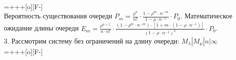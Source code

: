 \documentclass{article}
\begin{document}
\\
\entrymodifiers={+++[o][F-]}
\vspace{\baselineskip}
\\
Вероятность существования очереди \begin{math}P_m  = \displaystyle\frac{\rho^n}{n!} \cdot \displaystyle\frac{1 - \rho^m \cdot n^{-m}}{1 - \rho \cdot n^{-1}} \cdot P_0\end{math}. Математическое ожидание длины очереди \begin{math}E_m  = \displaystyle\frac{\rho^{n+1}}{n \cdot n!} \cdot \displaystyle\frac{(1 - \rho^m \cdot n^{-m}) \cdot [1 + m \cdot (1 -\rho \cdot n^{-1}) ] }{(1 - \rho \cdot n^{-1})^2} \cdot P_0\end{math}.
\vspace{\baselineskip}
\\
3. Рассмотрим систему без ограничений на длину очереди:
\begin{math}M_{\lambda}|M_{\mu}|n|\infty\end{math}
\vspace{\baselineskip}
\\
\entrymodifiers={+++[o][F-]}
\vspace{\baselineskip}
\\
\end{document}
